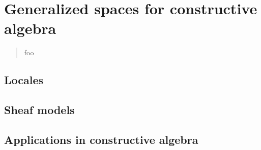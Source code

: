\documentclass{ws-rv9x6}
\begin{document}
\chapter{Generalized spaces for constructive algebra}

\author[I. Blechschmidt]{Ingo Blechschmidt}

\address{Universität Augsburg \\
Institut für Mathematik \\
Universitätsstr. 14 \\
86159 Augsburg, Germany}

\begin{abstract}
foo
\end{abstract}
\body


\section{Locales}

\section{Sheaf models}

\section{Applications in constructive algebra}
\end{document}

